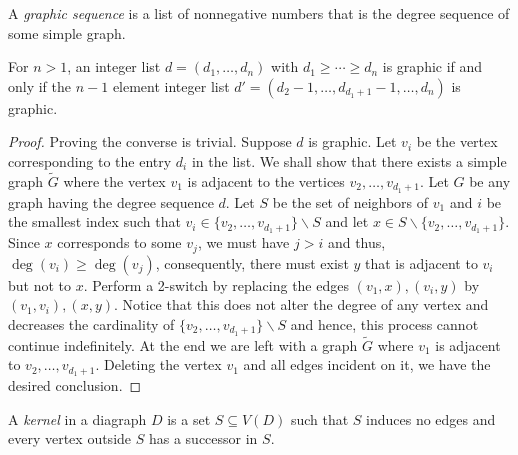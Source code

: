 \begin{definition}
    A \textit{graphic sequence} is a list of nonnegative numbers that is the degree sequence of some simple graph.
\end{definition}

\begin{theorem}
    For $n > 1$, an integer list $d = (d_1,\ldots, d_n)$ with $d_1\ge\cdots\ge d_n$ is graphic if and only if the $n - 1$ element integer list $d' = (d_2-1,\ldots,d_{d_1 + 1} - 1,\ldots, d_n)$ is graphic.
\end{theorem}
\begin{proof}
    Proving the converse is trivial. Suppose $d$ is graphic. Let $v_i$ be the vertex corresponding to the entry $d_i$ in the list. We shall show that there exists a simple graph $\widetilde{G}$ where the vertex $v_1$ is adjacent to the vertices $v_2,\ldots,v_{d_1 + 1}$. Let $G$ be any graph having the degree sequence $d$. Let $S$ be the set of neighbors of $v_1$ and $i$ be the smallest index such that $v_i\in\{v_2,\ldots,v_{d_1 +1}\}\backslash S$ and let $x\in S\backslash\{v_2,\ldots,v_{d_1 +1}\}$. Since $x$ corresponds to some $v_j$, we must have $j > i$ and thus, $\deg(v_i)\ge\deg(v_j)$, consequently, there must exist $y$ that is adjacent to $v_i$ but not to $x$. Perform a 2-switch by replacing the edges $(v_1,x), (v_i,y)$ by $(v_1,v_i), (x,y)$. Notice that this does not alter the degree of any vertex and decreases the cardinality of $\{v_2,\ldots,v_{d_1 + 1}\}\backslash S$ and hence, this process cannot continue indefinitely. At the end we are left with a graph $\widetilde{G}$ where $v_1$ is adjacent to $v_2,\ldots,v_{d_1 + 1}$. Deleting the vertex $v_1$ and all edges incident on it, we have the desired conclusion.
\end{proof}

\begin{definition}[Kernel]
    A \textit{kernel} in a diagraph $D$ is a set $S\subseteq V(D)$ such that $S$ induces no edges and every vertex outside $S$ has a successor in $S$.
\end{definition}

